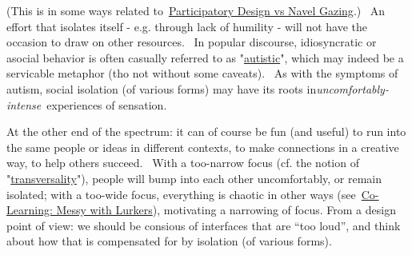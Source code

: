 (This is in some ways related
to~\href{http://socialmediaclassroom.com/host/peeragogy/forum/anti-patterns-concerns-complaints-and-critiques\#comment-1808}{Participatory
Design vs Navel Gazing}.) ~An effort that isolates itself - e.g. through
lack of humility - will not have the occasion to draw on other
resources. ~In popular discourse, idiosyncratic or asocial behavior is
often casually referred to as
"\href{http://en.wikipedia.org/wiki/Autism}{autistic}", which may indeed
be a servicable metaphor (tho not without some caveats). ~As with the
symptoms of autism, social isolation (of various forms) may have its
roots in\emph{uncomfortably-intense}~experiences of sensation.

At the other end of the spectrum: it can of course be fun (and useful)
to run into the same people or ideas in different contexts, to make
connections in a creative way, to help others succeed. ~With a
too-narrow focus (cf. the notion of
"\href{http://paragogy.net/ParagogyConcepts\#transversality}{transversality}"),
people will bump into each other uncomfortably, or remain isolated; with
a too-wide focus, everything is chaotic in other ways
(see~\href{http://socialmediaclassroom.com/host/peeragogy/forum/anti-patterns-concerns-complaints-and-critiques\#comment-2146}{Co-Learning:
Messy with Lurkers}), motivating a narrowing of focus. From a design
point of view: we should be consious of interfaces that are ``too
loud'', and think about how that is compensated for by isolation (of
various forms).
